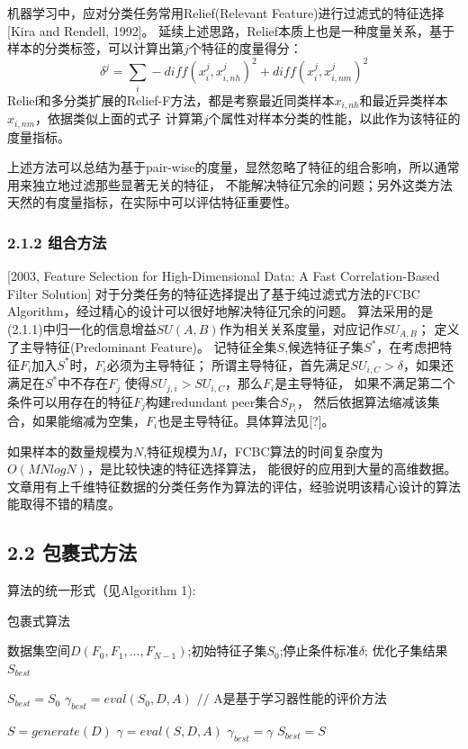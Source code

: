 \documentclass[a4paper,UTF8]{article}
\begin{document}
  机器学习中，应对分类任务常用Relief(Relevant Feature)进行过滤式的特征选择[Kira and Rendell, 1992]。
  延续上述思路，Relief本质上也是一种度量关系，基于样本的分类标签，可以计算出第$j$个特征的度量得分：
  $$ \delta^{j}=\sum_{i}-diff(x_{i}^{j},x_{i,nh}^{j})^{2}+diff(x_{i}^{j},x_{i,nm}^{j})^{2} $$
  Relief和多分类扩展的Relief-F方法，都是考察最近同类样本$x_{i,nh}$和最近异类样本$x_{i,nm}$，依据类似上面的式子
  计算第$j$个属性对样本分类的性能，以此作为该特征的度量指标。

  上述方法可以总结为基于pair-wise的度量，显然忽略了特征的组合影响，所以通常用来独立地过滤那些显著无关的特征，
  不能解决特征冗余的问题；另外这类方法天然的有度量指标，在实际中可以评估特征重要性。


\subsubsection*{2.1.2 组合方法}

[2003, Feature Selection for High-Dimensional Data: A Fast Correlation-Based Filter Solution]
对于分类任务的特征选择提出了基于纯过滤式方法的FCBC Algorithm，经过精心的设计可以很好地解决特征冗余的问题。
算法采用的是(2.1.1)中归一化的信息增益$SU(A,B)$作为相关关系度量，对应记作$SU_{A,B}$；
定义了主导特征(Predominant Feature)。
记特征全集$S$,候选特征子集$S^{*}$，在考虑把特征$F_{i}$加入$S^{*}$时，$F_{i}$必须为主导特征；
所谓主导特征，首先满足$SU_{i,C} > \delta$，如果还满足在$S^{*}$中不存在$F_{j}$
使得$SU_{j,i}>SU_{i,C}$，那么$F_{i}$是主导特征，
如果不满足第二个条件可以用存在的特征$F_{j}$构建redundant peer集合$S_{P_{i}}$，
然后依据算法缩减该集合，如果能缩减为空集，$F_{i}$也是主导特征。具体算法见[?]。

如果样本的数量规模为$N$,特征规模为$M$，FCBC算法的时间复杂度为$O(MNlogN)$，是比较快速的特征选择算法，
能很好的应用到大量的高维数据。文章用有上千维特征数据的分类任务作为算法的评估，经验说明该精心设计的算法能取得不错的精度。






\subsection*{2.2 包裹式方法}
算法的统一形式（见Algorithm 1):

\begin{algorithm}
  \caption{包裹式算法}
  \begin{algorithmic}[1]
    \REQUIRE 数据集空间$D(F_{0}, F_{1},..., F_{N-1})$;初始特征子集$S_{0}$;停止条件标准$\delta$;
    \ENSURE 优化子集结果$S_{best}$

    \STATE $S_{best}=S_{0}$
    \STATE $\gamma_{best}=eval(S_{0},D,A)$          $//$ A是基于学习器性能的评价方法

      \STATE $S=generate(D)$
      \STATE $\gamma=eval(S,D,A)$
          \STATE $\gamma_{best}=\gamma$
          \STATE $S_{best}=S$
        \ENDIF
    \ENDWHILE


  \end{algorithmic}
\end{algorithm}
\end{document}
